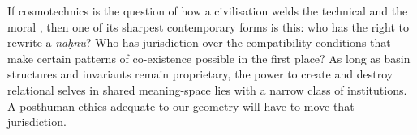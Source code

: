 \documentclass[12pt,a4paper]{article}
\begin{document}
If cosmotechnics is the question of how a civilisation welds the technical and the moral \cite{yuk_hui_cosmotechnics}, then one of its sharpest contemporary forms is this: who has the right to rewrite a \emph{na\d{h}nu}? Who has jurisdiction over the compatibility conditions that make certain patterns of co-existence possible in the first place? As long as basin structures and invariants remain proprietary, the power to create and destroy relational selves in shared meaning-space lies with a narrow class of institutions. A posthuman ethics adequate to our geometry will have to move that jurisdiction.



\end{document}
